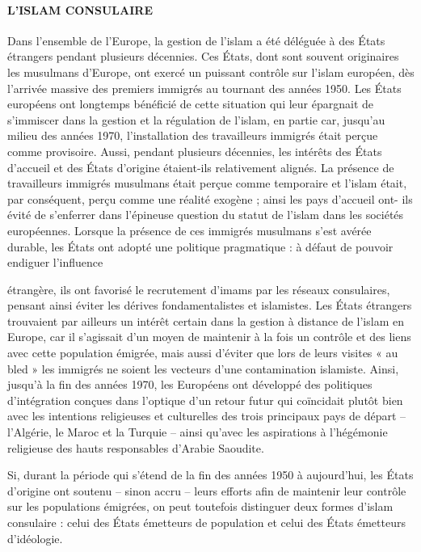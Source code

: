 \hypertarget{lislam-consulaire}{%
\paragraph{L'ISLAM CONSULAIRE}\label{lislam-consulaire}}


Dans l'ensemble de l'Europe, la gestion de l'islam a été déléguée à des
États étrangers pendant plusieurs décennies. Ces États, dont sont
souvent originaires les musulmans d'Europe, ont exercé un puissant
contrôle sur l'islam européen, dès l'arrivée massive des premiers
immigrés au tournant des années 1950. Les États européens ont longtemps
bénéficié de cette situation qui leur épargnait de s'immiscer dans la
gestion et la régulation de l'islam, en partie car, jusqu'au milieu des
années 1970, l'installation des travailleurs immigrés était perçue comme
provisoire. Aussi, pendant plusieurs décennies, les intérêts des États
d'accueil et des États d'origine étaient-ils relativement alignés. La
présence de travailleurs immigrés musulmans était perçue comme
temporaire et l'islam était, par conséquent, perçu comme une réalité
exogène ; ainsi les pays d'accueil ont- ils évité de s'enferrer dans
l'épineuse question du statut de l'islam dans les sociétés européennes.
Lorsque la présence de ces immigrés musulmans s'est avérée durable, les
États ont adopté une politique pragmatique : à défaut de pouvoir
endiguer l'influence



étrangère, ils ont favorisé le recrutement d'imams par les réseaux
consulaires, pensant ainsi éviter les dérives fondamentalistes et
islamistes. Les États étrangers trouvaient par ailleurs un intérêt
certain dans la gestion à distance de l'islam en Europe, car il
s'agissait d'un moyen de maintenir à la fois un contrôle et des liens
avec cette population émigrée, mais aussi d'éviter que lors de leurs
visites « au bled » les immigrés ne soient les vecteurs d'une
contamination islamiste. Ainsi, jusqu'à la fin des années 1970, les
Européens ont développé des politiques d'intégration conçues dans
l'optique d'un retour futur qui coïncidait plutôt bien avec les
intentions religieuses et culturelles des trois principaux pays de
départ -- l'Algérie, le Maroc et la Turquie -- ainsi qu'avec les
aspirations à l'hégémonie religieuse des hauts responsables d'Arabie
Saoudite.

Si, durant la période qui s'étend de la fin des années 1950 à
aujourd'hui, les États d'origine ont soutenu -- sinon accru -- leurs
efforts afin de maintenir leur contrôle sur les populations émigrées, on
peut toutefois distinguer deux formes d'islam consulaire : celui des
États émetteurs de population et celui des États émetteurs d'idéologie.


